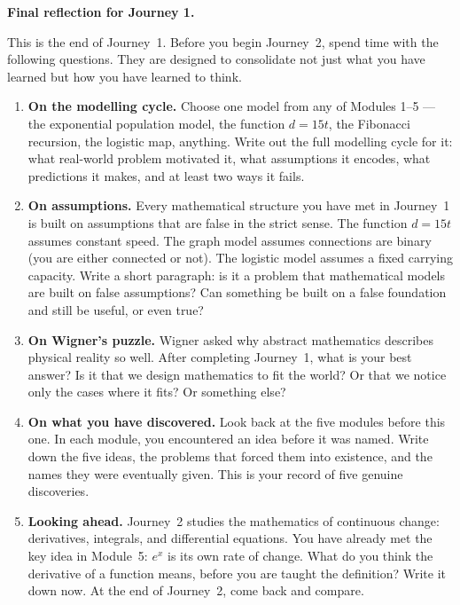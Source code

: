 \documentclass[12pt, a4paper]{article}
\newcounter{problem}
\begin{document}
\begin{reflectionbox}
\textbf{Final reflection for Journey 1.}

This is the end of Journey~1. Before you begin Journey~2, spend time with the following questions. They are designed to consolidate not just what you have learned but how you have learned to think.

\begin{enumerate}
  \item \textbf{On the modelling cycle.} Choose one model from any of Modules 1--5 --- the exponential population model, the function $d = 15t$, the Fibonacci recursion, the logistic map, anything. Write out the full modelling cycle for it: what real-world problem motivated it, what assumptions it encodes, what predictions it makes, and at least two ways it fails.

  \item \textbf{On assumptions.} Every mathematical structure you have met in Journey~1 is built on assumptions that are false in the strict sense. The function $d=15t$ assumes constant speed. The graph model assumes connections are binary (you are either connected or not). The logistic model assumes a fixed carrying capacity. Write a short paragraph: is it a problem that mathematical models are built on false assumptions? Can something be built on a false foundation and still be useful, or even true?

  \item \textbf{On Wigner's puzzle.} Wigner asked why abstract mathematics describes physical reality so well. After completing Journey~1, what is your best answer? Is it that we design mathematics to fit the world? Or that we notice only the cases where it fits? Or something else?

  \item \textbf{On what you have discovered.} Look back at the five modules before this one. In each module, you encountered an idea before it was named. Write down the five ideas, the problems that forced them into existence, and the names they were eventually given. This is your record of five genuine discoveries.

  \item \textbf{Looking ahead.} Journey~2 studies the mathematics of continuous change: derivatives, integrals, and differential equations. You have already met the key idea in Module~5: $e^x$ is its own rate of change. What do you think the derivative of a function means, before you are taught the definition? Write it down now. At the end of Journey~2, come back and compare.
\end{enumerate}
\end{reflectionbox}
\end{document}
